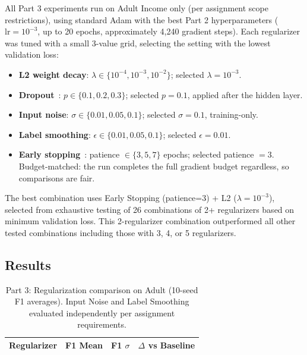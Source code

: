 \documentclass[letterpaper, 10 pt, conference]{ieeeconf}
\begin{document}
All Part 3 experiments run on Adult Income only (per assignment scope restrictions), using standard Adam with the best Part 2 hyperparameters ($\text{lr} = 10^{-3}$, up to 20 epochs, approximately 4{,}240 gradient steps). Each regularizer was tuned with a small 3-value grid, selecting the setting with the lowest validation loss:

\begin{itemize}
    \setlength{\itemsep}{1pt}
    \item \textbf{L2 weight decay}: $\lambda \in \{10^{-4}, 10^{-3}, 10^{-2}\}$; selected $\lambda = 10^{-3}$.
    \item \textbf{Dropout}~\cite{srivastava2014}: $p \in \{0.1, 0.2, 0.3\}$; selected $p = 0.1$, applied after the hidden layer.
    \item \textbf{Input noise}: $\sigma \in \{0.01, 0.05, 0.1\}$; selected $\sigma = 0.1$, training-only.
    \item \textbf{Label smoothing}: $\epsilon \in \{0.01, 0.05, 0.1\}$; selected $\epsilon = 0.01$.
    \item \textbf{Early stopping}~\cite{prechelt1998}: patience $\in \{3, 5, 7\}$ epochs; selected patience $= 3$. Budget-matched: the run completes the full gradient budget regardless, so comparisons are fair.
\end{itemize}

The best combination uses Early Stopping (patience=3) + L2 ($\lambda = 10^{-3}$), selected from exhaustive testing of 26 combinations of 2+ regularizers based on minimum validation loss. This 2-regularizer combination outperformed all other tested combinations including those with 3, 4, or 5 regularizers.

\subsection{Results}

\begin{table}[!htbp]
    \centering
    \caption{Part 3: Regularization comparison on Adult (10-seed F1 averages). Input Noise and Label Smoothing evaluated independently per assignment requirements.}
    \label{tab:part3}
    \setlength{\tabcolsep}{3pt}
    \begin{tabular}{@{}lccc@{}}
    \toprule
    Regularizer & F1 Mean & F1 $\sigma$ & $\Delta$ vs Baseline \\
    \midrule
    
    \bottomrule
    \end{tabular}
\end{table}
\end{document}
